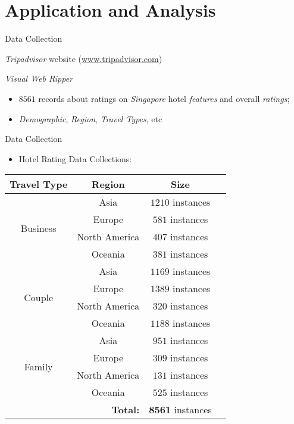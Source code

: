 \documentclass[
 size=12pt,
 paper=smartboard,  %
 mode=present, 		%
 display=slides, 	%
 style=tuliplab,  	%
 pauseslide,
 fleqn,leqno]{powerdot}
\begin{document}
\section{Application and Analysis}

\begin{slide}{Data Collection}
\begin{description}[type=1]
\item[Source] <1-> 
\emph{Tripadvisor} website (\url{www.tripadvisor.com})
\item[Extractor] <2-> 
\emph{Visual Web Ripper} %
\item[Data] <3-> 
\begin{itemize}
 \item<4-> $8561$ records about ratings on \emph{Singapore} hotel \emph{features} and overall \emph{ratings};
 \item<5-> \emph{Demographic}, \emph{Region}, \emph{Travel Types}, etc
\end{itemize} 
\end{description}
\end{slide}

\begin{slide}[toc=,bm=]{Data Collection}
\begin{itemize}
 \item<1-> Hotel Rating Data Collections:
\end{itemize}
{ \footnotesize \centering
\begin{tabular}{cccr}
\toprule
\textbf{Travel Type} & \textbf{Region} & \multicolumn{1}{c}{\textbf{Size}}\\
\midrule
\multirow{4}{*}{Business}  & Asia & $1210$ instances\\
  & Europe & $581$ instances\\
  & North America & $407$ instances \\
  & Oceania & $381$ instances\\
\midrule
      \multirow{4}{*}{Couple}  & Asia & $1169$ instances\\
 & Europe & $1389$ instances\\
 &North America & $320$ instances\\
  & Oceania & $1188$ instances\\
\midrule
        \multirow{4}{*}{Family}  & Asia & $951$ instances\\
 & Europe & $309$ instances\\
& North America & $131$ instances\\
  & Oceania & $525$ instances\\
\midrule
\multicolumn{2}{r}{\textbf{Total:}} & \textbf{8561} instances \\
\bottomrule
\end{tabular}
}
\end{slide}
\end{document}
